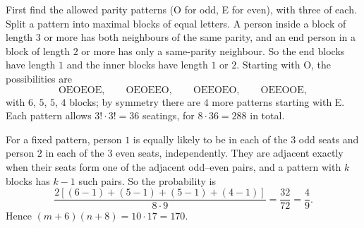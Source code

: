 First find the allowed parity patterns (O for odd, E for even), with three of each. Split a pattern into maximal blocks of equal letters. A person inside a block of length $3$ or more has both neighbours of the same parity, and an end person in a block of length $2$ or more has only a same-parity neighbour. So the end blocks have length $1$ and the inner blocks have length $1$ or $2$. Starting with O, the possibilities are
\[\text{OEOEOE},\qquad\text{OEOEEO},\qquad\text{OEEOEO},\qquad\text{OEEOOE},\]
with $6$, $5$, $5$, $4$ blocks; by symmetry there are $4$ more patterns starting with E. Each pattern allows $3!\cdot3!=36$ seatings, for $8\cdot36=288$ in total.

For a fixed pattern, person $1$ is equally likely to be in each of the $3$ odd seats and person $2$ in each of the $3$ even seats, independently. They are adjacent exactly when their seats form one of the adjacent odd--even pairs, and a pattern with $k$ blocks has $k-1$ such pairs. So the probability is
\[\dfrac{2\left[(6-1)+(5-1)+(5-1)+(4-1)\right]}{8\cdot9}=\dfrac{32}{72}=\dfrac49.\]
Hence $(m+6)(n+8)=10\cdot17=\boxed{170}$.
